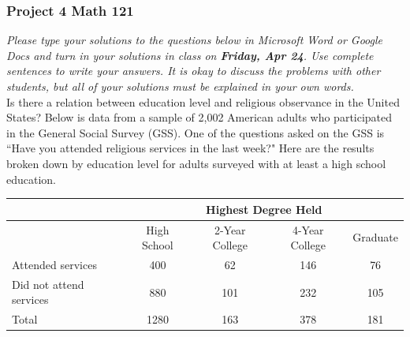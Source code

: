 \documentclass[12pt]{exam}
\begin{document}
\subsubsection*{Project 4 \hfill Math 121}

\textit{Please type your solutions to the questions below in Microsoft Word or Google Docs and turn in your solutions in class on \textbf{Friday, Apr 24}. Use complete sentences to write your answers. It is okay to discuss the problems with other students, but all of your solutions must be explained in your own words. } \\

\noindent
Is there a relation between education level and religious observance in the United States? Below is data from a sample of 2{,}002 American adults who participated in the General Social Survey (GSS).
One of the questions asked on the GSS is ``Have you attended religious services in the last week?"  Here are the results broken down by education level for adults surveyed with at least a high school education. 

\begin{center}
\begin{tabular}{l|cccc} 
& \multicolumn{4}{c}{Highest Degree Held} \\ \hline 
 & High School & 2-Year College & 4-Year College & Graduate \\ \hline
Attended services & 400 & 62 & 146 & 76 \\
Did not attend services & 880 & 101 & 232 & 105 \\ \hline
Total & 1280 & 163 & 378 & 181 \\ 
\end{tabular}
\end{center}
\end{document}
